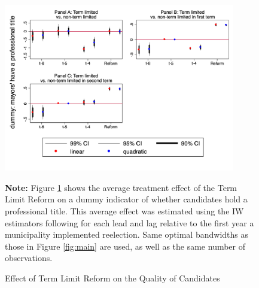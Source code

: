 \documentclass[12pt]{amsart}
\numberwithin{equation}{section}
\theoremstyle{definition}
\theoremstyle{definition}
\theoremstyle{definition}
\begin{document}
 \begin{figure}[h]   
\centering
 \caption{Effect of Term Limit Reform on the Quality of Candidates}
 \label{fig:quality_trend}
\includegraphics[width=0.9\textwidth]{../Figures_incumbency/quality_parallel.png}
       \captionsetup{justification=centering}
         
 \textbf{Note:} Figure \ref{fig:quality_trend} shows the average treatment effect of the Term Limit Reform on a dummy indicator of whether candidates hold a professional title. This average effect was estimated using the IW estimators following \citet{abraham_sun_2020} for each lead and lag relative to the first year a municipality implemented reelection. Same optimal bandwidths as those in Figure \ref{fig:main} are used, as well as the same number of observations.   
     
\end{figure}   
\end{document}
